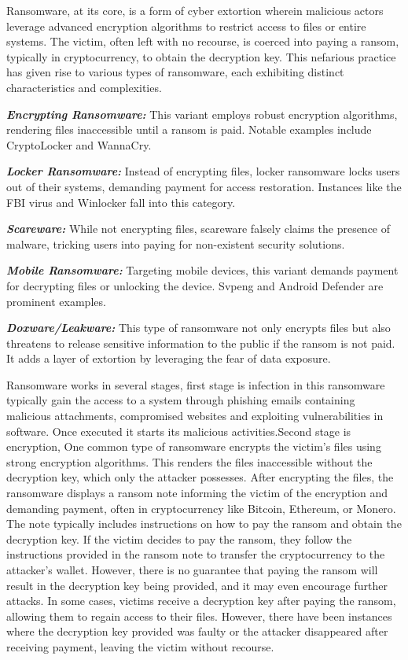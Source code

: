 \documentclass[12pt,letterpaper]{article}
\begin{document}
    Ransomware, at its core, is a form of cyber extortion wherein malicious actors leverage advanced encryption algorithms to restrict access to files or entire systems. The victim, often left with no recourse, is coerced into paying a ransom, typically in cryptocurrency, to obtain the decryption key. This nefarious practice has given rise to various types of ransomware, each exhibiting distinct characteristics and complexities.
    
    \textbf{\textit{Encrypting Ransomware:}} This variant employs robust encryption algorithms, rendering files inaccessible until a ransom is paid. Notable examples include CryptoLocker and WannaCry.

    \textbf{\textit{Locker Ransomware:}} Instead of encrypting files, locker ransomware locks users out of their systems, demanding payment for access restoration. Instances like the FBI virus and Winlocker fall into this category.

    \textbf{\textit{Scareware:}} While not encrypting files, scareware falsely claims the presence of malware, tricking users into paying for non-existent security solutions.

    \textbf{\textit{Mobile Ransomware:}} Targeting mobile devices, this variant demands payment for decrypting files or unlocking the device. Svpeng and Android Defender are prominent examples.
    
    \textbf{\textit{Doxware/Leakware:}} This type of ransomware not only encrypts files but also threatens to release sensitive information to the public if the ransom is not paid. It adds a layer of extortion by leveraging the fear of data exposure.
    
    Ransomware works in several stages, first stage is infection in this ransomware typically gain the access to a system through phishing emails containing malicious attachments, compromised websites and exploiting vulnerabilities in software. Once executed it starts its malicious activities.Second stage is encryption, One common type of ransomware encrypts the victim's files using strong encryption algorithms. This renders the files inaccessible without the decryption key, which only the attacker possesses. After encrypting the files, the ransomware displays a ransom note informing the victim of the encryption and demanding payment, often in cryptocurrency like Bitcoin, Ethereum, or Monero. The note typically includes instructions on how to pay the ransom and obtain the decryption key. If the victim decides to pay the ransom, they follow the instructions provided in the ransom note to transfer the cryptocurrency to the attacker's wallet. However, there is no guarantee that paying the ransom will result in the decryption key being provided, and it may even encourage further attacks. In some cases, victims receive a decryption key after paying the ransom, allowing them to regain access to their files. However, there have been instances where the decryption key provided was faulty or the attacker disappeared after receiving payment, leaving the victim without recourse.
    
\end{document}
